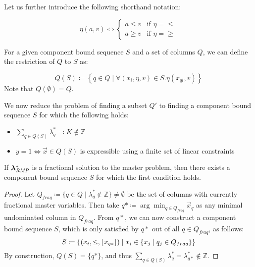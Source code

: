 Let us further introduce the following shorthand notation:

\begin{equation}
\eta(a, v) \Leftrightarrow
\begin{cases}
a \leq v & \text{if } \eta = \leq \\
a \geq v & \text{if } \eta = \geq
\end{cases}
\end{equation}

For a given component bound sequence $S$ and a set of columns $Q$, we can define the restriction of $Q$ to $S$ as:

\begin{equation}
Q(S) \coloneqq \left\{ q \in Q \mid \forall \left( x_i, \eta, v \right) \in S. \eta(x_{qi}, v) \right\}
\end{equation}
Note that $Q(\emptyset) = Q$.

We now reduce the problem of finding a subset $Q'$ to finding a component bound sequence $S$ for which the following holds:

\begin{itemize}
\item $\sum_{q \in Q(S)} \lambda_q^* \eqqcolon K \not\in \mathbb{Z}$
\item $y = 1 \Leftrightarrow \vec{x} \in Q(S)$ is expressible using a finite set of linear constraints
\end{itemize}

\begin{proposition}
If ${\bm{\lambda}}^*_{\textit{RMP}}{}$ is a fractional solution to the master problem, then there exists a component bound sequence $S$ for which the first condition holds.
\end{proposition}

\begin{proof}\label{pr:cg_bp_bp}
Let $Q_{fraq} \coloneqq \{ q \in Q \mid \lambda_q^* \not\in \mathbb{Z} \} \neq \emptyset$ be the set of columns with currently fractional master variables. Then take $q* \coloneqq \arg\min_{q \in Q_{fraq}} \vec{x}_q$ as any minimal undominated column in $Q_{fraq}$.
From $q*$, we can now construct a component bound sequence $S$, which is only satisfied by $q*$ out of all $q \in Q_{fraq}$, as follows:
\begin{equation}
S \coloneqq \left\{ \left( x_i, \leq, \lfloor x_{q*}\rfloor \right) \mid x_i \in \{x_j \mid q_j \in Q_{fraq}\} \right\}
\end{equation}
By construction, $Q(S) = \{q*\}$, and thus $\sum_{q \in Q(S)} \lambda_q^* = \lambda_{q*}^* \not\in \mathbb{Z}$.
\end{proof}

